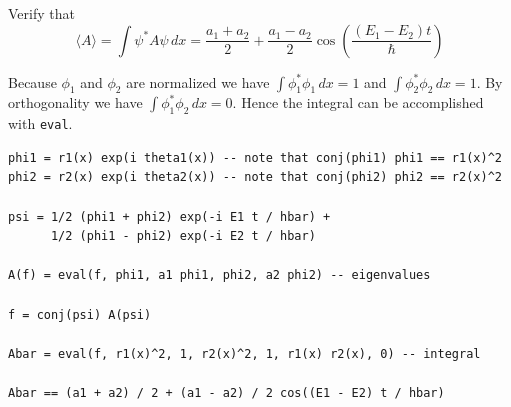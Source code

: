 \documentclass[12pt]{article}
\begin{document}
\begin{enumerate}
Verify that
\begin{equation*}
\langle A\rangle
=\int\psi^*A\psi\,dx
=\frac{a_1+a_2}{2}+\frac{a_1-a_2}{2}\cos\left(\frac{(E_1-E_2)t}{\hbar}\right)
\end{equation*}

Because $\phi_1$ and $\phi_2$ are normalized we have
$\int\phi_1^*\phi_1\,dx=1$ and $\int\phi_2^*\phi_2\,dx=1$.
By orthogonality we have $\int\phi_1^*\phi_2\,dx=0$.
Hence the integral can be accomplished with \verb$eval$.

{\color{blue}
\begin{verbatim}
phi1 = r1(x) exp(i theta1(x)) -- note that conj(phi1) phi1 == r1(x)^2
phi2 = r2(x) exp(i theta2(x)) -- note that conj(phi2) phi2 == r2(x)^2

psi = 1/2 (phi1 + phi2) exp(-i E1 t / hbar) +
      1/2 (phi1 - phi2) exp(-i E2 t / hbar)

A(f) = eval(f, phi1, a1 phi1, phi2, a2 phi2) -- eigenvalues

f = conj(psi) A(psi)

Abar = eval(f, r1(x)^2, 1, r2(x)^2, 1, r1(x) r2(x), 0) -- integral

Abar == (a1 + a2) / 2 + (a1 - a2) / 2 cos((E1 - E2) t / hbar)
\end{verbatim}}

\end{enumerate}
\end{document}
